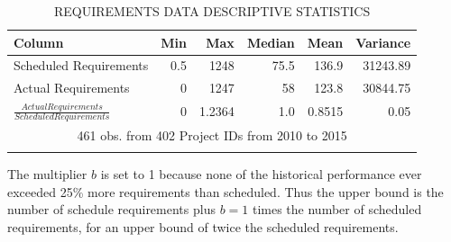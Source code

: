 \documentclass[SDSUThesis.tex]{subfiles}
\begin{document}
            \begin{longtable}{@{}l rr rrr}
                \toprule%
                 \centering%
                 {\bfseries Column}
                 & {\bfseries Min}
                 & {\bfseries Max}
                 & {\bfseries Median}
                 & {\bfseries Mean}
                 & {\bfseries Variance} \\
                
                \cmidrule[0.2pt](r{0.125em}){1-1}%
                \cmidrule[0.2pt](lr{0.125em}){2-2}%
                \cmidrule[0.2pt](l{0.125em}){3-3}%
                \cmidrule[0.2pt](l{0.125em}){4-4}%
                \cmidrule[0.2pt](l{0.125em}){5-5}%
                \endhead
                
                Scheduled Requirements & 0.5 & 1248 & 75.5 & 136.9 & 31243.89 \\
                \myrowcolour%
                Actual Requirements & 0 & 1247 & 58 & 123.8 & 30844.75 \\
                $\frac{Actual Requirements}{Scheduled Requirements}$ & 0 & 1.2364 & 1.0 & 0.8515 & 0.05 \\
                
                \bottomrule
                
                \multicolumn{6}{c}{461 obs. from 402 Project IDs from 2010 to 2015} \\
                
                \caption{REQUIREMENTS DATA DESCRIPTIVE STATISTICS}
                \label{tab:requirements_desc}
            \end{longtable}
            
            The multiplier $b$ is set to 1 because none of the historical performance
            ever exceeded 25\% more requirements than scheduled. Thus the upper
            bound is the number of schedule requirements plus $b=1$ times
            the number of scheduled requirements, for an upper bound of twice
            the scheduled requirements.
            
\end{document}
